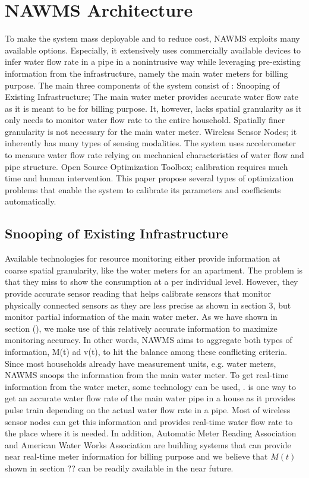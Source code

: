 \section{ NAWMS Architecture}
  \label{sec:architecture}
To make the system mass deployable and to reduce cost, NAWMS exploits many available options. Especially, it extensively uses commercially available devices to infer water flow rate in a pipe in a nonintrusive way while leveraging pre-existing information from the infrastructure, namely the main water meters for billing purpose. 
The main three components of the system consist of : 
 Snooping of Existing Infrastructure; The main water meter provides accurate water flow rate as it is meant to be for billing purpose. It, however, lacks spatial granularity as it only needs to monitor water flow rate to the entire household. Spatially finer granularity is not necessary for the main water meter. 
 Wireless Sensor Nodes; it inherently has many types of sensing modalities. The system uses accelerometer to measure water flow rate relying on mechanical characteristics of water flow and pipe structure.
 Open Source Optimization Toolbox; calibration requires much time and human intervention. This paper propose several types of optimization problems that enable the system to calibrate its parameters and coefficients automatically. 

\subsection{ Snooping of Existing Infrastructure }
  \label{subsec:snooping}
Available technologies for resource monitoring either provide information at coarse spatial granularity, like the water meters for an apartment. The problem is that they miss to show the consumption at a per individual level. 
However, they provide accurate sensor reading that helps calibrate sensors that monitor physically connected sensors as they are less precise as shown in section 3, but monitor partial information of the main water meter. As we have shown in section (), we make use of this relatively accurate information to maximize monitoring accuracy. In other words, NAWMS aims to aggregate both types of information, M(t) ad v(t), to hit the balance among these conflicting criteria. Since most households already have measurement units, e.g. water meters, NAWMS snoops the information from the main water meter.  
To get real-time information from the water meter, some technology can be used\cite{C700pulser}, \cite{AWWA2005}. \cite{C700pulser} is one way to get an accurate water flow rate of the main water pipe in a house as it provides pulse train depending on the actual water flow rate in a pipe. Most of wireless sensor nodes can get this information and provides real-time water flow rate to the place where it is needed. In addition, Automatic Meter Reading Association\cite{AMRA} and American Water Works Association \cite{AWWA2005} are building systems that can provide near real-time meter information for billing purpose and we believe that $M(t)$ shown in section ?? can be readily available in the near future. 

